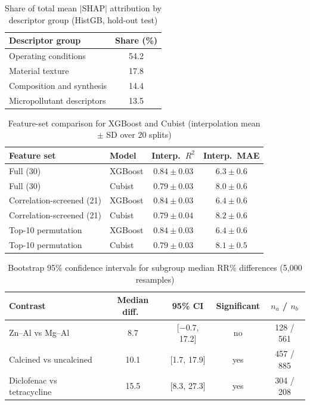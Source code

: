 \documentclass[12pt]{article}
\begin{document}
\begin{table}[h]
\centering
\caption{Share of total mean $|$SHAP$|$ attribution by descriptor group
(HistGB, hold-out test)}
\begin{tabular}{lc}
\toprule
Descriptor group & Share (\%) \\
\midrule
Operating conditions & 54.2 \\
Material texture & 17.8 \\
Composition and synthesis & 14.4 \\
Micropollutant descriptors & 13.5 \\
\bottomrule
\end{tabular}
\end{table}

\begin{table}[h]
\centering
\caption{Feature-set comparison for XGBoost and Cubist (interpolation
mean $\pm$ SD over 20 splits)}
\begin{tabular}{llcc}
\toprule
Feature set & Model & Interp.\ $R^2$ & Interp.\ MAE \\
\midrule
Full (30) & XGBoost & $0.84 \pm 0.03$ & $6.3 \pm 0.6$ \\
Full (30) & Cubist & $0.79 \pm 0.03$ & $8.0 \pm 0.6$ \\
Correlation-screened (21) & XGBoost & $0.84 \pm 0.03$ & $6.4 \pm 0.6$ \\
Correlation-screened (21) & Cubist & $0.79 \pm 0.04$ & $8.2 \pm 0.6$ \\
Top-10 permutation & XGBoost & $0.84 \pm 0.03$ & $6.4 \pm 0.6$ \\
Top-10 permutation & Cubist & $0.79 \pm 0.03$ & $8.1 \pm 0.5$ \\
\bottomrule
\end{tabular}
\end{table}

\begin{table}[h]
\centering
\caption{Bootstrap 95\% confidence intervals for subgroup median RR\%
differences (5,000 resamples)}
\begin{tabular}{lcccc}
\toprule
Contrast & Median diff.\ & 95\% CI & Significant & $n_a$ / $n_b$ \\
\midrule
Zn--Al vs Mg--Al & 8.7 & [$-0.7$, 17.2] & no & 128 / 561 \\
Calcined vs uncalcined & 10.1 & [1.7, 17.9] & yes & 457 / 885 \\
Diclofenac vs tetracycline & 15.5 & [8.3, 27.3] & yes & 304 / 208 \\
\bottomrule
\end{tabular}
\end{table}
\end{document}

